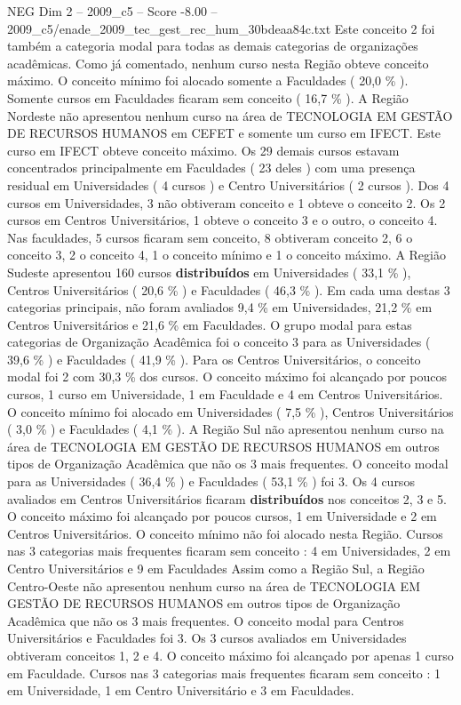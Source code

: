 \begin{textsample}{NEG Dim 2 – 2009\_c5 – Score -8.00 – 2009\_c5/enade\_2009\_tec\_gest\_rec\_hum\_30bdeaa84c.txt}
Este conceito 2 foi também a categoria modal para todas as demais categorias de organizações acadêmicas.
Como já comentado, nenhum curso nesta Região obteve conceito máximo.
O conceito mínimo foi alocado somente a Faculdades ( 20,0 \% ).
Somente cursos em Faculdades ficaram sem conceito ( 16,7 \% ).
A Região Nordeste não apresentou nenhum curso na área de TECNOLOGIA EM GESTÃO DE RECURSOS HUMANOS em CEFET e somente um curso em IFECT.
Este curso em IFECT obteve conceito máximo.
Os 29 demais cursos estavam concentrados principalmente em Faculdades ( 23 deles ) com uma presença residual em Universidades ( 4 cursos ) e Centro Universitários ( 2 cursos ).
Dos 4 cursos em Universidades, 3 não obtiveram conceito e 1 obteve o conceito 2.
Os 2 cursos em Centros Universitários, 1 obteve o conceito 3 e o outro, o conceito 4.
Nas faculdades, 5 cursos ficaram sem conceito, 8 obtiveram conceito 2, 6 o conceito 3, 2 o conceito 4, 1 o conceito mínimo e 1 o conceito máximo.
A Região Sudeste apresentou 160 cursos \textbf{distribuídos} em Universidades ( 33,1 \% ), Centros Universitários ( 20,6 \% ) e Faculdades ( 46,3 \% ).
Em cada uma destas 3 categorias principais, não foram avaliados 9,4 \% em Universidades, 21,2 \% em Centros Universitários e 21,6 \% em Faculdades.
O grupo modal para estas categorias de Organização Acadêmica foi o conceito 3 para as Universidades ( 39,6 \% ) e Faculdades ( 41,9 \% ).
Para os Centros Universitários, o conceito modal foi 2 com 30,3 \% dos cursos.
O conceito máximo foi alcançado por poucos cursos, 1 curso em Universidade, 1 em Faculdade e 4 em Centros Universitários.
O conceito mínimo foi alocado em Universidades ( 7,5 \% ), Centros Universitários ( 3,0 \% ) e Faculdades ( 4,1 \% ).
A Região Sul não apresentou nenhum curso na área de TECNOLOGIA EM GESTÃO DE RECURSOS HUMANOS em outros tipos de Organização Acadêmica que não os 3 mais frequentes.
O conceito modal para as Universidades ( 36,4 \% ) e Faculdades ( 53,1 \% ) foi 3.
Os 4 cursos avaliados em Centros Universitários ficaram \textbf{distribuídos} nos conceitos 2, 3 e 5.
O conceito máximo foi alcançado por poucos cursos, 1 em Universidade e 2 em Centros Universitários.
O conceito mínimo não foi alocado nesta Região.
Cursos nas 3 categorias mais frequentes ficaram sem conceito : 4 em Universidades, 2 em Centro Universitários e 9 em Faculdades Assim como a Região Sul, a Região Centro-Oeste não apresentou nenhum curso na área de TECNOLOGIA EM GESTÃO DE RECURSOS HUMANOS em outros tipos de Organização Acadêmica que não os 3 mais frequentes.
O conceito modal para Centros Universitários e Faculdades foi 3.
Os 3 cursos avaliados em Universidades obtiveram conceitos 1, 2 e 4.
O conceito máximo foi alcançado por apenas 1 curso em Faculdade.
Cursos nas 3 categorias mais frequentes ficaram sem conceito : 1 em Universidade, 1 em Centro Universitário e 3 em Faculdades.

\end{textsample}
